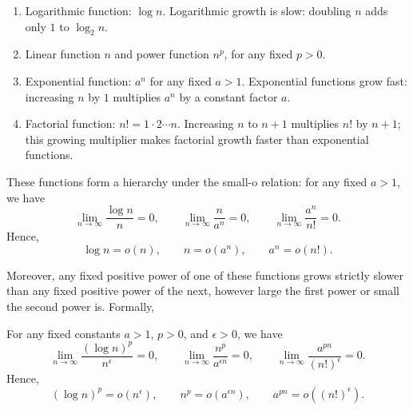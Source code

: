 \begin{enumerate}
\item {Logarithmic function: $\log n$.}
Logarithmic growth is slow: doubling $n$ adds only $1$ to $\log_2 n$.

\item {Linear function $n$ and power function $n^p$, for any fixed $p > 0$.}

\item {Exponential function: $a^n$ for any fixed $a > 1$.}
Exponential functions grow fast: increasing $n$ by $1$ multiplies $a^n$ by a constant factor $a$.

\item {Factorial function: $n!=1\cdot 2\cdots n$.}
Increasing $n$ to $n+1$ multiplies $n!$ by $n+1$;
this growing multiplier makes factorial growth
faster than exponential functions.
\end{enumerate}

These functions form a hierarchy under the small-o relation: for any fixed $a>1$,
we have
\[
    \lim_{n\to\infty}\frac{\log n}{n}=0, \qquad
    \lim_{n\to\infty}\frac{n}{a^n}=0, \qquad
    \lim_{n\to\infty}\frac{a^n}{n!}=0.
\]
Hence,
\[
    \log n=o(n),\qquad
    n=o(a^n),\qquad
    a^n=o(n!).
\]

Moreover, any fixed positive power of one of these functions grows strictly
slower than any fixed positive power of the next, however large the
first power or small the second power is. Formally, 
\begin{claim}\label{claim:growth}
For any fixed constants $a>1$, $p>0$, and $\epsilon>0$, we have
\[
    \lim_{n\to\infty}\frac{(\log n)^p}{n^\epsilon}=0, \qquad
    \lim_{n\to\infty}\frac{n^p}{a^{\epsilon n}}=0, \qquad
    \lim_{n\to\infty}\frac{a^{pn}}{(n!)^\epsilon}=0.
\]
Hence,
\[
    (\log n)^p =o(n^\epsilon),\qquad
    n^p =o(a^{\epsilon n}),\qquad
    a^{pn} = o((n!)^\epsilon).
\]
\end{claim}

